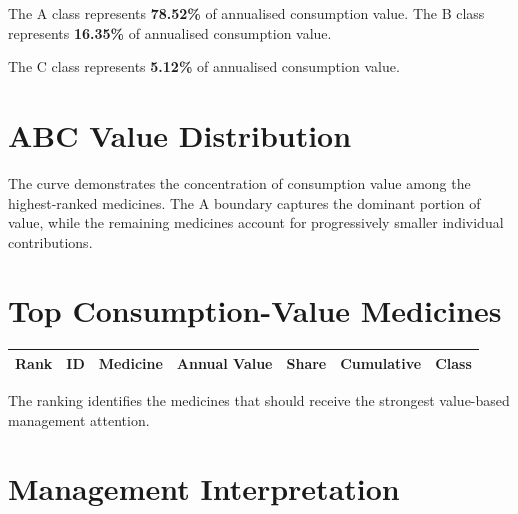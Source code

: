 \documentclass[12pt]{article}
\begin{document}
The A class represents \textbf{78.52\%} of annualised consumption value.
The B class represents \textbf{16.35\%} of annualised consumption value.

The C class represents \textbf{5.12\%} of annualised consumption value.

\section{ABC Value Distribution}

\begin{center}
\end{center}

The curve demonstrates the concentration of consumption value among the
highest-ranked medicines. The A boundary captures the dominant portion of
value, while the remaining medicines account for progressively smaller
individual contributions.

\section{Top Consumption-Value Medicines}

\begin{longtable}{rllrrrr}
\toprule
Rank & ID & Medicine & Annual Value & Share & Cumulative & Class\\
\midrule

\bottomrule
\end{longtable}

The ranking identifies the medicines that should receive the strongest
value-based management attention.

\section{Management Interpretation}
\end{document}

